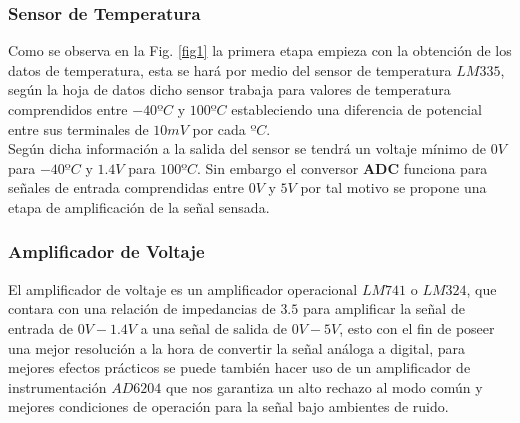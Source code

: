 \documentclass[twocolumn]{IEEEtran}
\begin{document}
\subsubsection{Sensor de Temperatura}
\noindent
Como se observa en la Fig. \ref{fig1} la primera etapa empieza con la obtención de los datos de temperatura, esta se hará por medio del sensor de temperatura $LM335$, según la hoja de datos dicho sensor trabaja para valores de temperatura comprendidos entre $-40 ºC$ y $100 ºC$ estableciendo una diferencia de potencial entre sus terminales de $10 mV$ por cada $ºC$.\\ 
Según dicha información a la salida del sensor se tendrá un voltaje mínimo de $0 V$ para $-40 ºC$ y $1.4 V$ para $100 ºC$. Sin embargo el conversor \textbf{ADC} funciona para señales de entrada comprendidas entre $0V$ y $5V$ por tal motivo se propone una etapa de amplificación de la señal sensada.

\subsubsection{Amplificador de Voltaje}\label{amp}
\noindent
El amplificador de voltaje es un amplificador operacional $LM741$ o $LM324$, que contara con una relación de impedancias de $3.5$ para amplificar la señal  de entrada  de $0V -1.4 V$ a una señal de salida de $0V-5V$, esto con el fin de poseer una mejor resolución a la hora de convertir la señal análoga a digital, para mejores efectos prácticos se puede también hacer uso de un amplificador de instrumentación $AD6204$ que nos garantiza un alto rechazo al modo común y mejores condiciones de operación para la señal bajo ambientes de ruido. 
\end{document}
